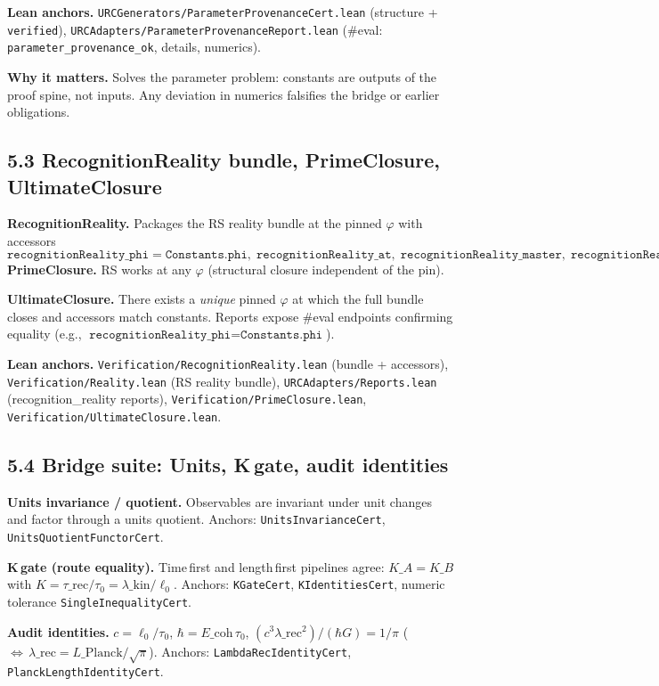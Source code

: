 \documentclass[11pt]{article}
\begin{document}
\textbf{Lean anchors.} \texttt{URCGenerators/ParameterProvenanceCert.lean} (structure + \texttt{verified}), \texttt{URCAdapters/ParameterProvenanceReport.lean} (\#eval: \texttt{parameter\_provenance\_ok}, details, numerics).

\textbf{Why it matters.} Solves the parameter problem: constants are outputs of the proof spine, not inputs. Any deviation in numerics falsifies the bridge or earlier obligations.

\subsection*{5.3 RecognitionReality bundle, PrimeClosure, UltimateClosure}
\textbf{RecognitionReality.} Packages the RS reality bundle at the pinned $\varphi$ with accessors
\[
  \texttt{recognitionReality\_phi} = \texttt{Constants.phi},\; \texttt{recognitionReality\_at},\; \texttt{recognitionReality\_master},\; \texttt{recognitionReality\_definitionalUniqueness},\; \texttt{recognitionReality\_bi}\,.
\]
\textbf{PrimeClosure.} RS works at any $\varphi$ (structural closure independent of the pin).

\textbf{UltimateClosure.} There exists a \emph{unique} pinned $\varphi$ at which the full bundle closes and accessors match constants. Reports expose \#eval endpoints confirming equality (e.g., $\texttt{recognitionReality\_phi} = \texttt{Constants.phi}$).

\textbf{Lean anchors.} \texttt{Verification/RecognitionReality.lean} (bundle + accessors), \texttt{Verification/Reality.lean} (RS reality bundle), \texttt{URCAdapters/Reports.lean} (recognition\_reality reports), \texttt{Verification/PrimeClosure.lean}, \texttt{Verification/UltimateClosure.lean}.

\subsection*{5.4 Bridge suite: Units, K\,gate, audit identities}
\textbf{Units invariance / quotient.} Observables are invariant under unit changes and factor through a units quotient. Anchors: \texttt{UnitsInvarianceCert}, \texttt{UnitsQuotientFunctorCert}.

\textbf{K\,gate (route equality).} Time\,first and length\,first pipelines agree: $K\_A=K\_B$ with $K=\tau\_{\!\mathrm{rec}}/\tau_0=\lambda\_{\!\mathrm{kin}}/\ell_0$. Anchors: \texttt{KGateCert}, \texttt{KIdentitiesCert}, numeric tolerance \texttt{SingleInequalityCert}.

\textbf{Audit identities.} $c=\ell_0/\tau_0$, $\hbar=E\_{\!\mathrm{coh}}\,\tau_0$, $(c^3\lambda\_{\!\mathrm{rec}}^2)/(\hbar G)=1/\pi$ ($\Leftrightarrow\,\lambda\_{\!\mathrm{rec}}=L\_{\!\mathrm{Planck}}/\sqrt{\pi}$). Anchors: \texttt{LambdaRecIdentityCert}, \texttt{PlanckLengthIdentityCert}.
\end{document}
